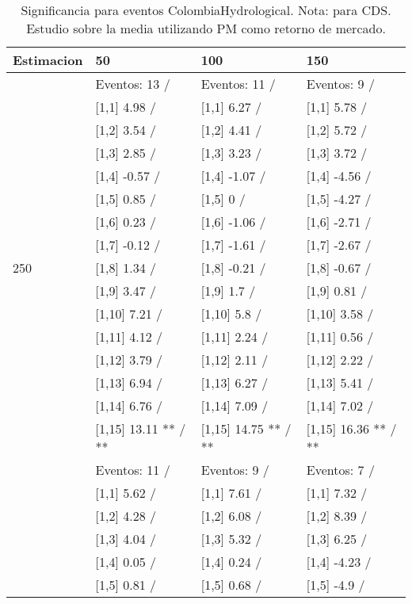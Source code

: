 \begin{table}

\caption{Significancia para eventos ColombiaHydrological. Nota: para CDS. Estudio sobre la media utilizando PM como retorno de mercado.}
\centering
\begin{tabular}[t]{llll}
\toprule
Estimacion & 50 & 100 & 150\\
\midrule
 & Eventos:  13 / & Eventos:  11 / & Eventos:  9 /\\
 & {}[1,1] 4.98  / & {}[1,1] 6.27  / & {}[1,1] 5.78  /\\
 & {}[1,2] 3.54  / & {}[1,2] 4.41  / & {}[1,2] 5.72  /\\
 & {}[1,3] 2.85  / & {}[1,3] 3.23  / & {}[1,3] 3.72  /\\
 & {}[1,4] -0.57  / & {}[1,4] -1.07  / & {}[1,4] -4.56  /\\
\addlinespace
 & {}[1,5] 0.85  / & {}[1,5] 0  / & {}[1,5] -4.27  /\\
 & {}[1,6] 0.23  / & {}[1,6] -1.06  / & {}[1,6] -2.71  /\\
 & {}[1,7] -0.12  / & {}[1,7] -1.61  / & {}[1,7] -2.67  /\\
250 & {}[1,8] 1.34  / & {}[1,8] -0.21  / & {}[1,8] -0.67  /\\
 & {}[1,9] 3.47  / & {}[1,9] 1.7  / & {}[1,9] 0.81  /\\
\addlinespace
 & {}[1,10] 7.21  / & {}[1,10] 5.8  / & {}[1,10] 3.58  /\\
 & {}[1,11] 4.12  / & {}[1,11] 2.24  / & {}[1,11] 0.56  /\\
 & {}[1,12] 3.79  / & {}[1,12] 2.11  / & {}[1,12] 2.22  /\\
 & {}[1,13] 6.94  / & {}[1,13] 6.27  / & {}[1,13] 5.41  /\\
 & {}[1,14] 6.76  / & {}[1,14] 7.09  / & {}[1,14] 7.02  /\\
\addlinespace
 & {}[1,15] 13.11 ** / ** & {}[1,15] 14.75 ** / ** & {}[1,15] 16.36 ** / **\\
 & Eventos:  11 / & Eventos:  9 / & Eventos:  7 /\\
 & {}[1,1] 5.62  / & {}[1,1] 7.61  / & {}[1,1] 7.32  /\\
 & {}[1,2] 4.28  / & {}[1,2] 6.08  / & {}[1,2] 8.39  /\\
 & {}[1,3] 4.04  / & {}[1,3] 5.32  / & {}[1,3] 6.25  /\\
\addlinespace
 & {}[1,4] 0.05  / & {}[1,4] 0.24  / & {}[1,4] -4.23  /\\
 & {}[1,5] 0.81  / & {}[1,5] 0.68  / & {}[1,5] -4.9  /\\

\end{tabular}
\end{table}
